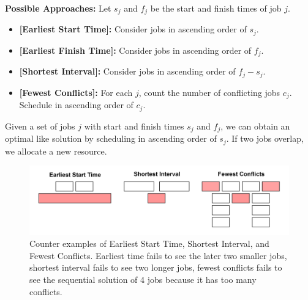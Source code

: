 \newpage
\textbf{Possible Approaches:} Let $s_j$ and $f_j$ be the start and finish times of job $j$.
\begin{itemize}
    \item \textbf{[Earliest Start Time]:} Consider jobs in ascending order of $s_j$.
    \item \textbf{[Earliest Finish Time]:} Consider jobs in ascending order of $f_j$.
    \item \textbf{[Shortest Interval]:} Consider jobs in ascending order of $f_j - s_j$.
    \item \textbf{[Fewest Conflicts]:} For each $j$, count the number of conflicting jobs $c_j$. Schedule in ascending order of $c_j$.
\end{itemize}
\begin{theo}

    \label{theo:est}

    Given a set of jobs $j$ with start and finish times $s_j$ and $f_j$, we can obtain an optimal like solution by scheduling in ascending order of $s_j$.
    If two jobs overlap, we allocate a new resource.
\end{theo}

\vspace{-.5em}
\begin{figure}[h]
    \begin{center}
      \includegraphics[width=\textwidth]{./Sections/sched/interval/counter.png}
    \end{center}
     
    \vspace{-.5em}
    \caption{Counter examples of Earliest Start Time, Shortest Interval, and Fewest Conflicts.
     Earliest time fails to see the later two smaller jobs, shortest interval fails to see two longer jobs, fewest 
     conflicts fails to see the sequential solution of 4 jobs because it has too many conflicts.}\label{fig:counter}
\end{figure}

